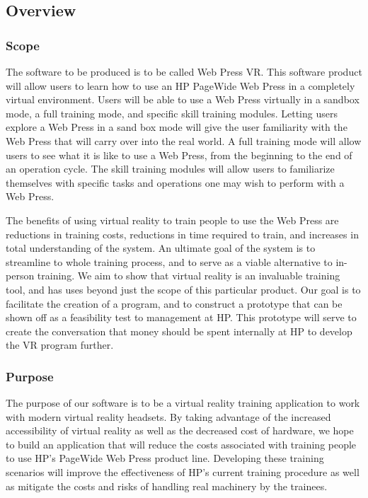 \documentclass[onecolumn, draftclsnofoot,10pt, compsoc]{IEEEtran}
\begin{document}
\clearpage




\subsection{Overview}
\subsubsection{Scope}
The software to be produced is to be called Web Press VR. This software product will allow users to learn how to use an HP PageWide Web Press in a completely virtual environment. Users will be able to use a Web Press virtually in a sandbox mode, a full training mode, and specific skill training modules. Letting users explore a Web Press in a sand box mode will give the user familiarity with the Web Press that will carry over into the real world. A full training mode will allow users to see what it is like to use a Web Press, from the beginning to the end of an operation cycle. The skill training modules will allow users to familiarize themselves with specific tasks and operations one may wish to perform with a Web Press.

The benefits of using virtual reality to train people to use the Web Press are reductions in training costs, reductions in time required to train, and increases in total understanding of the system. An ultimate goal of the system is to streamline to whole training process, and to serve as a viable alternative to in-person training. We aim to show that virtual reality is an invaluable training tool, and has uses beyond just the scope of this particular product. Our goal is to facilitate the creation of a program, and to construct a prototype that can be shown off as a feasibility test to management at HP. This prototype will serve to create the conversation that money should be spent internally at HP to develop the VR program further.
\subsubsection{Purpose}
The purpose of our software is to be a virtual reality training application to work with modern virtual reality headsets. By taking advantage of the increased accessibility of virtual reality as well as the decreased cost of hardware, we hope to build an application that will reduce the costs associated with training people to use HP's PageWide Web Press product line. Developing these training scenarios will improve the effectiveness of HP's current training procedure as well as mitigate the costs and risks of handling real machinery by the trainees.
\end{document}
